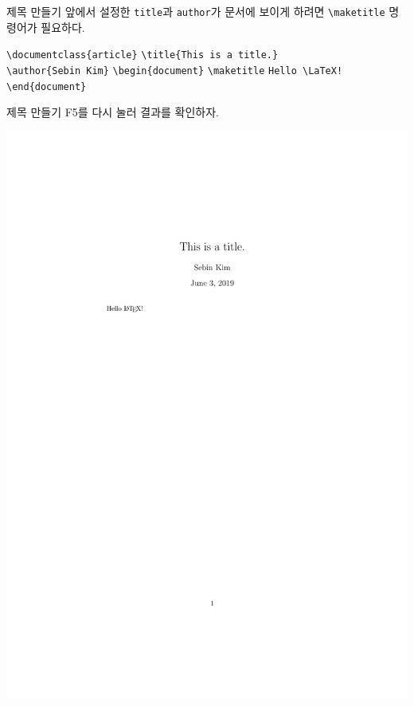 \documentclass[12pt]{gshs_lecture}
\newenvironment{codeblock}[1]{
	\begin{block}{#1}
		\setstretch{1.0}
		\begin{small}
}{
		\end{small}
	\end{block}
}
\begin{document}
\begin{frame}[t]{제목 만들기}
앞에서 설정한 \texttt{title}과 \texttt{author}가 문서에 보이게 하려면 \texttt{\textbackslash maketitle} 명령어가 필요하다.
\vskip 1pc
\begin{codeblock}{}
	\texttt{\textbackslash documentclass\{article\}}
	\vskip 1pc
	\texttt{\textbackslash title\{This is a title.\}} \\
	\texttt{\textbackslash author\{Sebin Kim\}}
	\vskip 1pc
	\texttt{\textbackslash begin\{document\}}
	\vskip 1pc
	{\color{red}
	\texttt{\textbackslash maketitle}
	}
	\vskip 1pc
	\texttt{Hello \textbackslash LaTeX!}
	\vskip 1pc
	\texttt{\textbackslash end\{document\}}
\end{codeblock}
\end{frame}

\begin{frame}[t]{제목 만들기}
	F5를 다시 눌러 결과를 확인하자.
	\vskip 1pc
	\begin{framed}
		\includegraphics[width=\textwidth,trim={4cm 19cm 4cm 4.5cm},clip]{./pdfs/ex3.pdf}
	\end{framed}
\end{frame}
\end{document}
